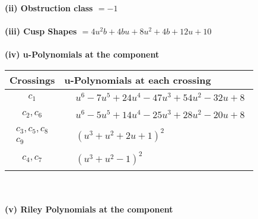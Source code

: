 \documentclass[1p]{elsarticle_modified}
\theoremstyle{definition}
\begin{document}
\flushleft \textbf{(ii) Obstruction class $= -1$}\\~\\
\flushleft \textbf{(iii) Cusp Shapes $= 4 u^2 b+4 b u+8 u^2+4 b+12 u+10$}\\~\\
\newpage\renewcommand{\arraystretch}{1}
\flushleft \textbf{(iv) u-Polynomials at the component}\newline \\
\begin{tabular}{m{50pt}|m{274pt}}
Crossings & \hspace{64pt}u-Polynomials at each crossing \\
\hline $$\begin{aligned}c_{1}\end{aligned}$$&$\begin{aligned}
&u^6-7 u^5+24 u^4-47 u^3+54 u^2-32 u+8
\end{aligned}$\\
\hline $$\begin{aligned}c_{2},c_{6}\end{aligned}$$&$\begin{aligned}
&u^6-5 u^5+14 u^4-25 u^3+28 u^2-20 u+8
\end{aligned}$\\
\hline $$\begin{aligned}c_{3},c_{5},c_{8}\\c_{9}\end{aligned}$$&$\begin{aligned}
&(u^3+u^2+2 u+1)^2
\end{aligned}$\\
\hline $$\begin{aligned}c_{4},c_{7}\end{aligned}$$&$\begin{aligned}
&(u^3+u^2-1)^2
\end{aligned}$\\
\hline
\end{tabular}\\~\\
\newpage\renewcommand{\arraystretch}{1}
\flushleft \textbf{(v) Riley Polynomials at the component}\newline \\
\end{document}

